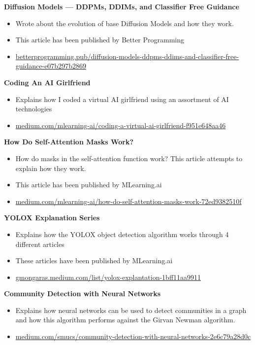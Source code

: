 \documentclass[a4paper,10pt]{article}
\begin{document}
\noindent\textbf{Diffusion Models — DDPMs, DDIMs, and Classifier Free Guidance}
\begin{itemize}[noitemsep,topsep=0pt]
  \item Wrote about the evolution of base Diffusion Models and how they work.
  \item This article has been published by Better Programming
  \item \href{https://betterprogramming.pub/diffusion-models-ddpms-ddims-and-classifier-free-guidance-e07b297b2869}{betterprogramming.pub/diffusion-models-ddpms-ddims-and-classifier-free-guidance-e07b297b2869}
\end{itemize}

\noindent\textbf{Coding An AI Girlfriend}
\begin{itemize}[noitemsep,topsep=0pt]
  \item Explains how I coded a virtual AI girlfriend using an assortment of AI technologies
  \item \href{https://medium.com/mlearning-ai/coding-a-virtual-ai-girlfriend-f951e648aa46}{medium.com/mlearning-ai/coding-a-virtual-ai-girlfriend-f951e648aa46}
\end{itemize}

\noindent\textbf{How Do Self-Attention Masks Work?}
\begin{itemize}[noitemsep,topsep=0pt]
  \item How do masks in the self-attention function work? This article attempts to explain how they work.
  \item This article has been published by MLearning.ai
  \item \href{https://medium.com/mlearning-ai/how-do-self-attention-masks-work-72ed9382510f}{medium.com/mlearning-ai/how-do-self-attention-masks-work-72ed9382510f}
\end{itemize}

\noindent\textbf{YOLOX Explanation Series}
\begin{itemize}[noitemsep,topsep=0pt]
  \item Explains how the YOLOX object detection algorithm works through 4 different articles
  \item These articles have been published by MLearning.ai
  \item \href{https://gmongaras.medium.com/list/yolox-explantation-1bff11aa9911}{gmongaras.medium.com/list/yolox-explantation-1bff11aa9911}
\end{itemize}

\noindent\textbf{Community Detection with Neural Networks}
\begin{itemize}[noitemsep,topsep=0pt]
  \item Explains how neural networks can be used to detect communities in a graph and how this algorithm performs against the Girvan Newman algorithm.
  \item \href{https://medium.com/smucs/community-detection-with-neural-networks-2e6c79a28d0c}{medium.com/smucs/community-detection-with-neural-networks-2e6c79a28d0c}
\end{itemize}
\end{document}
